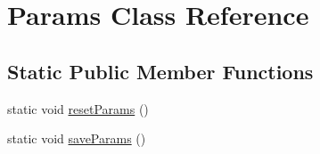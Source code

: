 \hypertarget{classdata_1_1_params}{}\section{Params Class Reference}
\label{classdata_1_1_params}
\subsection*{Static Public Member Functions}
\begin{DoxyCompactItemize}
\item 
static void \hyperlink{classdata_1_1_params_a0a4fc9bb0ad6624d84e20d1cd9644187}{reset\+Params} ()
\item 
static void \hyperlink{classdata_1_1_params_a523f79a85b888809ee8b6220ef0e20d1}{save\+Params} ()
\end{DoxyCompactItemize}
